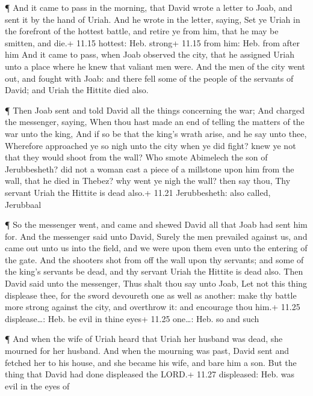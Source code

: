  ¶ And it came to pass in the morning, that David wrote a
letter to Joab, and sent it by the hand of Uriah.  And he
wrote in the letter, saying, Set ye Uriah in the forefront of the
hottest battle, and retire ye from him, that he may be smitten, and
die.+ 11.15 hottest: Heb. strong+ 11.15 from him: Heb. from after him
 And it came to pass, when Joab observed the city, that he
assigned Uriah unto a place where he knew that valiant men were.
 And the men of the city went out, and fought with Joab:
and there fell some of the people of the servants of David; and Uriah
the Hittite died also.

 ¶ Then Joab sent and told David all the things concerning
the war;  And charged the messenger, saying, When thou hast
made an end of telling the matters of the war unto the king,
 And if so be that the king's wrath arise, and he say unto
thee, Wherefore approached ye so nigh unto the city when ye did fight?
knew ye not that they would shoot from the wall?  Who smote
Abimelech the son of Jerubbesheth? did not a woman cast a piece of a
millstone upon him from the wall, that he died in Thebez? why went ye
nigh the wall? then say thou, Thy servant Uriah the Hittite is dead
also.+ 11.21 Jerubbesheth: also called, Jerubbaal

 ¶ So the messenger went, and came and shewed David all
that Joab had sent him for.  And the messenger said unto
David, Surely the men prevailed against us, and came out unto us into
the field, and we were upon them even unto the entering of the gate.
 And the shooters shot from off the wall upon thy servants;
and some of the king's servants be dead, and thy servant Uriah the
Hittite is dead also.  Then David said unto the messenger,
Thus shalt thou say unto Joab, Let not this thing displease thee, for
the sword devoureth one as well as another: make thy battle more strong
against the city, and overthrow it: and encourage thou him.+ 11.25
displease\ldots: Heb. be evil in thine eyes+ 11.25 one\ldots: Heb. so
and such

 ¶ And when the wife of Uriah heard that Uriah her husband
was dead, she mourned for her husband.  And when the
mourning was past, David sent and fetched her to his house, and she
became his wife, and bare him a son. But the thing that David had done
displeased the LORD.+ 11.27 displeased: Heb. was evil in the eyes of

